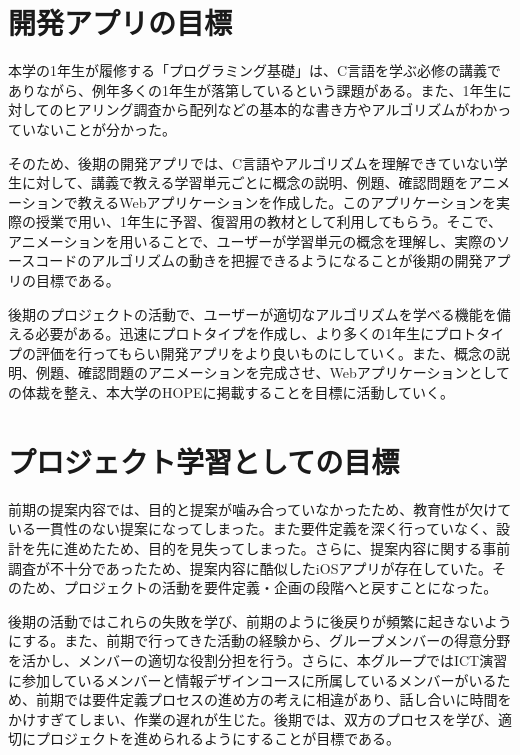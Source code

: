 \documentclass[openany,11pt,papersize]{jsbook}
\begin{document}
\section{開発アプリの目標}
本学の1年生が履修する「プログラミング基礎」は、C言語を学ぶ必修の講義でありながら、例年多くの1年生が落第しているという課題がある。また、1年生に対してのヒアリング調査から配列などの基本的な書き方やアルゴリズムがわかっていないことが分かった。

\par
そのため、後期の開発アプリでは、C言語やアルゴリズムを理解できていない学生に対して、講義で教える学習単元ごとに概念の説明、例題、確認問題をアニメーションで教えるWebアプリケーションを作成した。このアプリケーションを実際の授業で用い、1年生に予習、復習用の教材として利用してもらう。そこで、アニメーションを用いることで、ユーザーが学習単元の概念を理解し、実際のソースコードのアルゴリズムの動きを把握できるようになることが後期の開発アプリの目標である。
\par
後期のプロジェクトの活動で、ユーザーが適切なアルゴリズムを学べる機能を備える必要がある。迅速にプロトタイプを作成し、より多くの1年生にプロトタイプの評価を行ってもらい開発アプリをより良いものにしていく。また、概念の説明、例題、確認問題のアニメーションを完成させ、Webアプリケーションとしての体裁を整え、本大学のHOPEに掲載することを目標に活動していく。

\section{プロジェクト学習としての目標}
前期の提案内容では、目的と提案が噛み合っていなかったため、教育性が欠けている一貫性のない提案になってしまった。また要件定義を深く行っていなく、設計を先に進めたため、目的を見失ってしまった。さらに、提案内容に関する事前調査が不十分であったため、提案内容に酷似したiOSアプリが存在していた。そのため、プロジェクトの活動を要件定義・企画の段階へと戻すことになった。
\par
後期の活動ではこれらの失敗を学び、前期のように後戻りが頻繁に起きないようにする。また、前期で行ってきた活動の経験から、グループメンバーの得意分野を活かし、メンバーの適切な役割分担を行う。さらに、本グループではICT演習に参加しているメンバーと情報デザインコースに所属しているメンバーがいるため、前期では要件定義プロセスの進め方の考えに相違があり、話し合いに時間をかけすぎてしまい、作業の遅れが生じた。後期では、双方のプロセスを学び、適切にプロジェクトを進められるようにすることが目標である。


\end{document}
